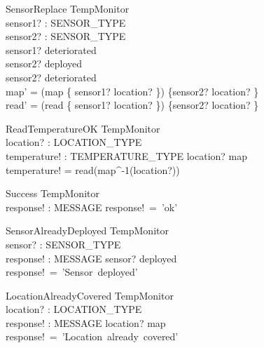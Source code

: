 \documentclass[12pt]{article}
\begin{document}
		
		\begin{schema}{SensorReplace}
			\Delta TempMonitor\\
			sensor1? : SENSOR\_TYPE\\
			sensor2? : SENSOR\_TYPE\\
			\where
			sensor1? \in deteriorated\\
			sensor2? \notin deployed\\
			sensor2? \notin deteriorated\\			
			map' = (map \cap \{ sensor1? \mapsto location? \}) \cup \{sensor2? \mapsto location? \}\\
			read' = (read \cap \{ sensor1? \mapsto location? \}) \cup \{sensor2? \mapsto location? \}\\
		\end{schema}
		
		\begin{schema}{ReadTemperatureOK}
			\Xi TempMonitor\\
			location? : LOCATION\_TYPE\\
			temperature! : TEMPERATURE\_TYPE
			\where
			location? \in \ran map\\
			temperature! = read(map^{-1}(location?))\\
		\end{schema}
		
		
	
		\begin{schema}{Success}
			\Xi TempMonitor\\
			response! : MESSAGE
			\where
			response!~=~'ok'\\
		\end{schema}
		
		
		
		\begin{schema}{SensorAlreadyDeployed}
			\Xi TempMonitor\\
			sensor? : SENSOR\_TYPE\\
			response! : MESSAGE
			\where
			sensor? \in deployed\\
			response!~=~'Sensor~deployed'\\
		\end{schema}
		
		
		
		\begin{schema}{LocationAlreadyCovered}
			\Xi TempMonitor\\
			location? : LOCATION\_TYPE\\
			response! : MESSAGE
			\where
			location? \in \ran map\\
			response!~=~'Location~already~covered'
		\end{schema}
		
\end{document}
